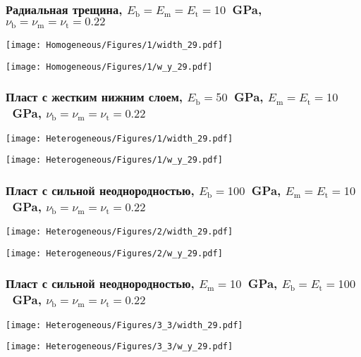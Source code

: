 \begin{frame}
    \frametitle{Радиальная трещина, $E_\text{b} = E_\text{m} = E_\text{t} = 10$~GPa, $\nu_\text{b} = \nu_\text{m} = \nu_\text{t} = 0.22$}
    \begin{minipage}[t]{0.4\linewidth}
        \texttt{[image: Homogeneous/Figures/1/width\_29.pdf]}
    \end{minipage}
    \hfill
    \begin{minipage}[t]{0.57\linewidth}
        \texttt{[image: Homogeneous/Figures/1/w\_y\_29.pdf]}
    \end{minipage}
\end{frame}

\begin{frame}
    \frametitle{Пласт с жестким нижним слоем, $E_\text{b} = 50$~GPa, $E_\text{m} = E_\text{t} = 10$~GPa, $\nu_\text{b} = \nu_\text{m} = \nu_\text{t} = 0.22$}
    \begin{minipage}[t]{0.4\linewidth}
        \texttt{[image: Heterogeneous/Figures/1/width\_29.pdf]}
    \end{minipage}
    \hfill
    \begin{minipage}[t]{0.57\linewidth}
        \texttt{[image: Heterogeneous/Figures/1/w\_y\_29.pdf]}
    \end{minipage}
\end{frame}

\begin{frame}
    \frametitle{Пласт с сильной неоднородностью, $E_\text{b} = 100$~GPa, $E_\text{m} = E_\text{t} = 10$~GPa, $\nu_\text{b} = \nu_\text{m} = \nu_\text{t} = 0.22$}
    \begin{minipage}[t]{0.4\linewidth}
        \texttt{[image: Heterogeneous/Figures/2/width\_29.pdf]}
    \end{minipage}
    \hfill
    \begin{minipage}[t]{0.57\linewidth}
        \texttt{[image: Heterogeneous/Figures/2/w\_y\_29.pdf]}
    \end{minipage}
\end{frame}

\begin{frame}
    \frametitle{Пласт с сильной неоднородностью, $E_\text{m} = 10$~GPa, $E_\text{b} = E_\text{t} = 100$~GPa, $\nu_\text{b} = \nu_\text{m} = \nu_\text{t} = 0.22$}
    \begin{minipage}[t]{0.4\linewidth}
        \texttt{[image: Heterogeneous/Figures/3\_3/width\_29.pdf]}
    \end{minipage}
    \hfill
    \begin{minipage}[t]{0.57\linewidth}
        \texttt{[image: Heterogeneous/Figures/3\_3/w\_y\_29.pdf]}
    \end{minipage}
\end{frame}

